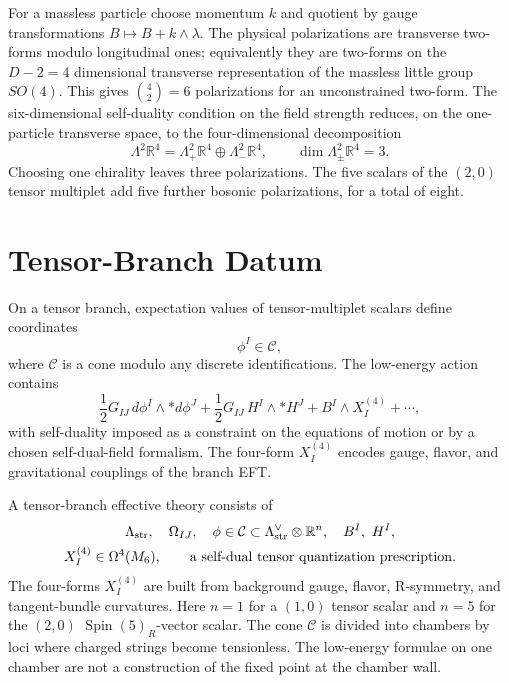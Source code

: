 For a massless particle choose momentum \(k\) and quotient by gauge
transformations \(B\mapsto B+k\wedge\lambda\).  The physical polarizations
are transverse two-forms modulo longitudinal ones; equivalently they are
two-forms on the \(D-2=4\) dimensional transverse representation of the
massless little group \(SO(4)\).  This gives \(\binom42=6\) polarizations for
an unconstrained two-form.  The six-dimensional self-duality condition on
the field strength reduces, on the one-particle transverse space, to the
four-dimensional decomposition
\[
  \Lambda^2\mathbb R^4
  =
  \Lambda^2_+\mathbb R^4\oplus
  \Lambda^2_-\mathbb R^4 ,
  \qquad
  \dim\Lambda^2_\pm\mathbb R^4=3 .
\]
Choosing one chirality leaves three polarizations.  The five scalars of the
\((2,0)\) tensor multiplet add five further bosonic polarizations, for a
total of eight.

\section{Tensor-Branch Datum}

On a tensor branch, expectation values of tensor-multiplet scalars define
coordinates
\[
  \phi^I\in\mathcal C ,
\]
where \(\mathcal C\) is a cone modulo any discrete identifications.  The
low-energy action contains
\begin{equation}
  \frac12 G_{IJ}\,d\phi^I\wedge *d\phi^J
  +
  \frac12 G_{IJ}\,H^I\wedge *H^J
  +
  B^I\wedge X_I^{(4)}
  +\cdots ,
  \label{eq:six-d-tensor-branch-action}
\end{equation}
with self-duality imposed as a constraint on the equations of motion or by a
chosen self-dual-field formalism.  The four-form \(X_I^{(4)}\) encodes gauge,
flavor, and gravitational couplings of the branch EFT.

\begin{definition}
\label{def:six-d-tensor-branch-effective-theory}
A tensor-branch effective theory consists of
\[
\begin{gathered}
  \Lambda_{\rm str},\quad \Omega_{IJ},\quad
  \phi\in\mathcal C\subset \Lambda_{\rm str}^{\vee}\otimes\mathbb R^n,
  \quad
  B^I,\ H^I,\\
  X_I^{(4)}\in\Omega^4(M_6),
  \qquad
  \text{a self-dual tensor quantization prescription.}
\end{gathered}
\]
The four-forms \(X_I^{(4)}\) are built from background gauge, flavor,
R-symmetry, and tangent-bundle curvatures.  Here \(n=1\) for a \((1,0)\)
tensor scalar and \(n=5\) for the
\((2,0)\) \(\operatorname{Spin}(5)_R\)-vector scalar.  The cone
\(\mathcal C\) is divided into chambers by loci where charged strings become
tensionless.  The low-energy formulae on one chamber are not a construction
of the fixed point at the chamber wall.
\end{definition}

